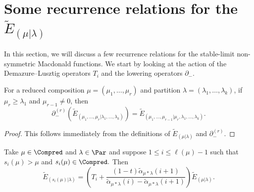 \section{Some recurrence relations for the \texorpdfstring{$\widetilde{E}_{(\mu|\lambda)}$}{E\_(mu | lambda)}}\label{recurrence relations section}

In this section, we will discuss a few recurrence relations for the stable-limit non-symmetric Macdonald functions. We start by looking at the action of the Demazure--Lusztig operators $T_i$ and the lowering operators $\partial_{-}$.

\begin{prop}
    For a reduced composition $\mu = (\mu_1,\ldots,\mu_r)$ and partition $\lambda =(\lambda_1,\ldots,\lambda_k)$, if $\mu_r \geq \lambda_1$ and $\mu_{r-1} \neq 0$, then 
    \begin{equation}
        \partial_{-}^{(r)} \left( \widetilde{E}_{(\mu_1,\ldots,\mu_r|\lambda_1,\ldots,\lambda_k)} \right) = \widetilde{E}_{(\mu_1,\ldots,\mu_{r-1}|\mu_r,\lambda_1,\ldots,\lambda_k)}.
    \end{equation}
\end{prop}
\begin{proof}
    This follows immediately from the definitions of $\widetilde{E}_{(\mu|\lambda)}$ and $\partial_{-}^{(r)}.$
\end{proof}

\begin{prop}
Take $\mu \in \Compred$ and $\lambda \in \Par$ and suppose $1\leq i \leq \ell(\mu) -1$ such that $s_i(\mu) > \mu$ and $s_i(\mu) \in \Compred.$  Then 
\begin{equation}
    \widetilde{E}_{(s_i(\mu)|\lambda)} = 
  \left( T_i + \frac{(1-t)\widetilde{\alpha}_{\mu*\lambda}(i+1)}{\widetilde{\alpha}_{\mu*\lambda}(i)- \widetilde{\alpha}_{\mu*\lambda}(i+1)} \right)  \widetilde{E}_{(\mu|\lambda)}.
\end{equation}
\end{prop}

